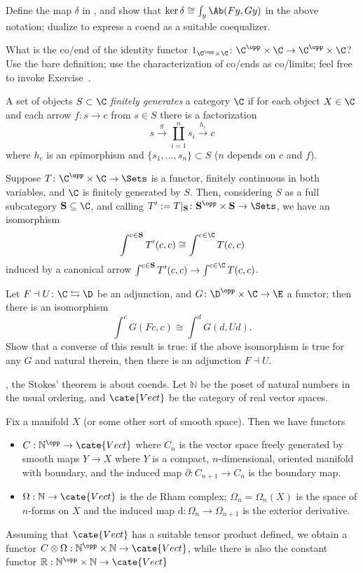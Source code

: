 \begin{exerciseset}
\begin{exercisepoints}
\item \label{ex1:keryoneda} Define the map $\delta$ in , and show that $\ker\delta\cong \int_y \Ab(Fy, Gy)$ in the above notation; dualize to express a coend as a suitable coequalizer.
\item \label{ex1:coendofid} What is the co/end of the identity functor $1_{\C^\opp\times \C}\colon \C^\opp\times \C\to \C^\opp\times \C$? Use the bare definition; use the characterization of co/ends as co/limits; feel free to invoke Exercise~. 
\item A set of objects $S\subset\C$ \emph{finitely generates} a category $\C$ if for each object $X\in\C$ and each arrow $f : s\to c$ from $s\in S$ there is a factorization
\[
s \xrightarrow{g} \coprod_{i=1}^n s_i\xrightarrow{h_c} c
\]
where $h_c$ is an epimorphism and $\{s_1, \dots, s_n\}\subset S$ ($n$ depends on $c$ and $f$).

Suppose $T\colon \C^\opp\times \C\to \Sets$ is a functor, finitely continuous in both variables, and $\C$ is finitely generated by $S$. Then, considering $S$ as a full subcategory $\mathbf{S}\subseteq \C$, and calling $T' := T|_{\mathbf S}\colon \mathbf{S}^\opp\times\mathbf{S} \to \Sets$, we have an isomorphism
\[
\int^{c\in \mathbf{S}} T'(c,c) \cong \int^{c\in \C} T(c,c)
\] 
induced by a canonical arrow $\int^{c\in \mathbf{S}} T'(c,c) \to \int^{c\in \C} T(c,c)$.
\item \label{ex1:acriterion} Let $F\dashv U\colon \C\leftrightarrows \D$ be an adjunction, and $G \colon \D^\opp\times \C\to \E$ a functor; then there is an isomorphism
\[
\int^c G(Fc,c) \cong \int^d G(d,Ud).
\]
Show that a converse of this result is true: if the above isomorphism is true for any $G$ and natural therein, then there is an adjunction $F\dashv U$.
\item \cite{1229249}, the Stokes' theorem is about coends. Let $\mathbb{N}$ be the poset of natural numbers in the usual ordering, and $\cate{Vect}$ be the category of real vector spaces. 

Fix a manifold $X$ (or some other sort of smooth space). Then we have functors
\begin{itemize}
	\item $C: \mathbb{N}^\opp \to \cate{Vect}$ where $C_n$ is the vector space freely generated by smooth maps $Y \to X$ where $Y$ is a compact, $n$-dimensional, oriented manifold with boundary, and the induced map $\partial: C_{n+1} \to C_n$ is the boundary map.
	\item $\Omega: \mathbb{N} \to \cate{Vect}$ is the de Rham complex; $\Omega_n = \Omega_n(X)$ is the space of $n$-forms on $X$ and the induced map $\mathrm d: \Omega_n \to \Omega_{n+1}$ is the exterior derivative.
\end{itemize}
Assuming that $\cate{Vect}$ has a suitable tensor product defined, we obtain a functor $C \otimes \Omega: \mathbb{N}^\opp \times \mathbb{N} \to \cate{Vect}$, while there is also the constant functor $\mathbb R: \mathbb{N}^\opp \times \mathbb{N} \to \cate{Vect}$


\end{exercisepoints}
\end{exerciseset}
